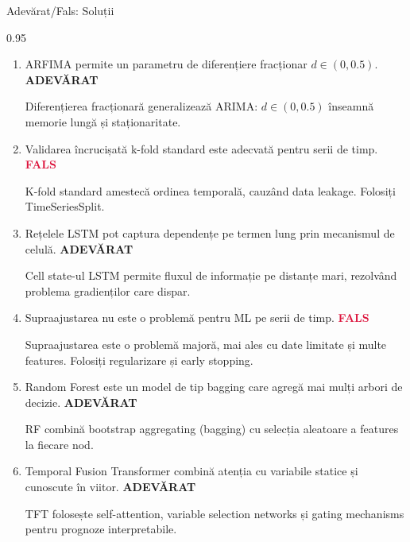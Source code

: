 \documentclass[9pt, aspectratio=169, t]{beamer}
\begin{document}
\begin{frame}{Adevărat/Fals: Soluții}
    \begin{cminipage}{0.95\textwidth}
    {\small
    \begin{enumerate}\setlength{\itemsep}{1pt}
        \item ARFIMA permite un parametru de diferențiere fracționar $d \in (0, 0.5)$. \hfill \textcolor{Forest}{\textbf{ADEVĂRAT}}

        {\footnotesize \textcolor{MediumGray}{Diferențierea fracționară generalizează ARIMA: $d \in (0, 0.5)$ înseamnă memorie lungă și staționaritate.}}

        \item Validarea încrucișată k-fold standard este adecvată pentru serii de timp. \hfill \textcolor{Crimson}{\textbf{FALS}}

        {\footnotesize \textcolor{MediumGray}{K-fold standard amestecă ordinea temporală, cauzând data leakage. Folosiți TimeSeriesSplit.}}

        \item Rețelele LSTM pot captura dependențe pe termen lung prin mecanismul de celulă. \hfill \textcolor{Forest}{\textbf{ADEVĂRAT}}

        {\footnotesize \textcolor{MediumGray}{Cell state-ul LSTM permite fluxul de informație pe distanțe mari, rezolvând problema gradienților care dispar.}}

        \item Supraajustarea nu este o problemă pentru ML pe serii de timp. \hfill \textcolor{Crimson}{\textbf{FALS}}

        {\footnotesize \textcolor{MediumGray}{Supraajustarea este o problemă majoră, mai ales cu date limitate și multe features. Folosiți regularizare și early stopping.}}

        \item Random Forest este un model de tip bagging care agregă mai mulți arbori de decizie. \hfill \textcolor{Forest}{\textbf{ADEVĂRAT}}

        {\footnotesize \textcolor{MediumGray}{RF combină bootstrap aggregating (bagging) cu selecția aleatoare a features la fiecare nod.}}

        \item Temporal Fusion Transformer combină atenția cu variabile statice și cunoscute în viitor. \hfill \textcolor{Forest}{\textbf{ADEVĂRAT}}

        {\footnotesize \textcolor{MediumGray}{TFT folosește self-attention, variable selection networks și gating mechanisms pentru prognoze interpretabile.}}
    \end{enumerate}
    }
    \end{cminipage}
\end{frame}
\end{document}
